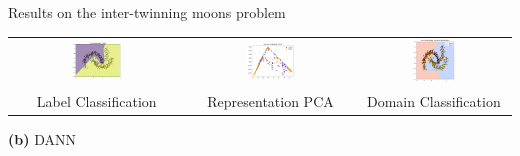 \documentclass{beamer}
\begin{document}
\begin{frame}{Results on the inter-twinning moons problem}
\begin{minipage}{0.8\linewidth}
\centering
\begin{adjustbox}{max width=\textwidth}
\begin{tabular}{ccc}
\includegraphics[width=0.3\textwidth]{label_decision_dann.png} &
\includegraphics[width=0.3\textwidth]{feature_dann.png} &
\includegraphics[width=0.3\textwidth]{domain_decision_dann.png} \\
\small Label Classification & \small Representation PCA & \small Domain Classification
\end{tabular}
\end{adjustbox}
\end{minipage}

\vspace{0.3cm}
\centering
\small\textbf{(b)} DANN

\end{frame}
\end{document}
